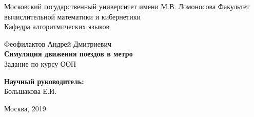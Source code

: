 \begin{titlepage}
    \begin{center}
        Московский государственный университет имени М.В. Ломоносова
        Факультет вычислительной математики и кибернетики \\
        Кафедра алгоритмических языков
        \vfill


        Феофилактов Андрей Дмитриевич \\[\bigskipamount]
        \textbf{\Large Симуляция движения поездов в метро} \\[\bigskipamount]
        Задание по курсу ООП

        \begin{flushright}
            \textbf{Научный руководитель:} \\
            Большакова Е.И.
        \end{flushright}

        \vfill

        Москва, 2019
    \end{center}
\end{titlepage}
